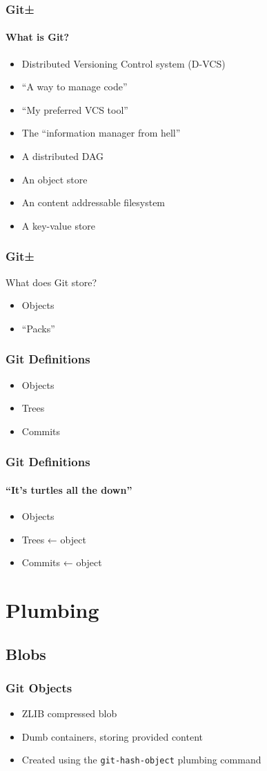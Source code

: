 \documentclass{beamer}
\begin{document}
\begin{frame}
\frametitle{Git±}
\framesubtitle{What is Git?}
\begin{itemize}
\item<2->{Distributed Versioning Control system (D-VCS)}
\item<3->{``A way to manage code''}
\item<4->{``My preferred VCS tool''}
\item<5->{The ``information manager from hell''}
\item<6->{A distributed DAG}
\item<7->{An object store}
\item<8->{An content addressable filesystem}
\item<9->{A key-value store}
\end{itemize}
\end{frame}

\begin{frame}
\frametitle{Git±}
What does Git store?
\begin{itemize}
\item<2->{Objects}
\item<3->{``Packs''}
\end{itemize}
\end{frame}

\begin{frame}
\frametitle{Git Definitions}
\begin{itemize}
\item{Objects}
\item{Trees}
\item{Commits}
\end{itemize}
\end{frame}

\begin{frame}
\frametitle{Git Definitions}
\framesubtitle{``It's turtles all the down''}
\begin{itemize}
\item{Objects}
\item{Trees ← object}
\item{Commits ← object}
\end{itemize}
\end{frame}

\section{Plumbing}
\subsection{Blobs}
\begin{frame}
\frametitle{Git Objects}
\begin{itemize}
\item{ZLIB compressed blob}
\item{Dumb containers, storing provided content}
\item{Created using the \texttt{git-hash-object} plumbing command}
\end{itemize}
\end{frame}
\end{document}
